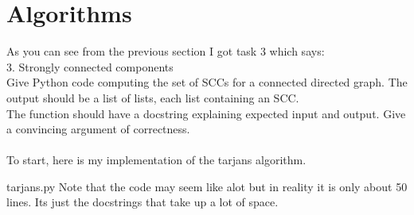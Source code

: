 \documentclass{article}
\begin{document}
\section{Algorithms}
As you can see from the previous section I got task 3 which says:\\
3. Strongly connected components\\
Give Python code computing the set of SCCs for a connected directed graph. The output should be a list of lists, each list containing an SCC. \\The function should have a docstring explaining expected input and output.
Give a convincing argument of correctness.\\
\\
To start, here is my implementation of the tarjans algorithm.

{tarjans.py}
Note that the code may seem like alot but in reality it is only about 50 lines. Its just the docstrings that take up a lot of space.
\end{document}

